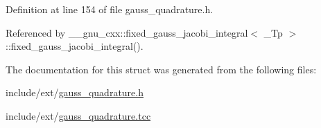 Definition at line 154 of file gauss\+\_\+quadrature.\+h.



Referenced by \+\_\+\+\_\+gnu\+\_\+cxx\+::fixed\+\_\+gauss\+\_\+jacobi\+\_\+integral$<$ \+\_\+\+Tp $>$\+::fixed\+\_\+gauss\+\_\+jacobi\+\_\+integral().



The documentation for this struct was generated from the following files\+:\begin{DoxyCompactItemize}
\item 
include/ext/\hyperlink{gauss__quadrature_8h}{gauss\+\_\+quadrature.\+h}\item 
include/ext/\hyperlink{gauss__quadrature_8tcc}{gauss\+\_\+quadrature.\+tcc}\end{DoxyCompactItemize}

